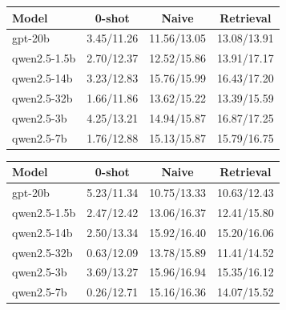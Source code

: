 \begin{tabular}{|l|c|c|c|}
\hline
Model & 0-shot & Naive & Retrieval \\
\hline
gpt-20b & 3.45/11.26 & 11.56/13.05 & 13.08/13.91 \\
qwen2.5-1.5b & 2.70/12.37 & 12.52/15.86 & 13.91/17.17 \\
qwen2.5-14b & 3.23/12.83 & 15.76/15.99 & 16.43/17.20 \\
qwen2.5-32b & 1.66/11.86 & 13.62/15.22 & 13.39/15.59 \\
qwen2.5-3b & 4.25/13.21 & 14.94/15.87 & 16.87/17.25 \\
qwen2.5-7b & 1.76/12.88 & 15.13/15.87 & 15.79/16.75 \\
\hline
\end{tabular}

\begin{tabular}{|l|c|c|c|}
\hline
Model & 0-shot & Naive & Retrieval \\
\hline
gpt-20b & 5.23/11.34 & 10.75/13.33 & 10.63/12.43 \\
qwen2.5-1.5b & 2.47/12.42 & 13.06/16.37 & 12.41/15.80 \\
qwen2.5-14b & 2.50/13.34 & 15.92/16.40 & 15.20/16.06 \\
qwen2.5-32b & 0.63/12.09 & 13.78/15.89 & 11.41/14.52 \\
qwen2.5-3b & 3.69/13.27 & 15.96/16.94 & 15.35/16.12 \\
qwen2.5-7b & 0.26/12.71 & 15.16/16.36 & 14.07/15.52 \\
\hline
\end{tabular}

